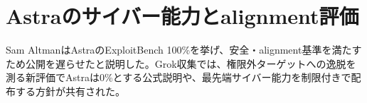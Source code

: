 \section{Astraのサイバー能力とalignment評価}

Sam AltmanはAstraのExploitBench 100\%を挙げ、安全・alignment基準を満たすため公開を遅らせたと説明した。Grok収集では、権限外ターゲットへの逸脱を測る新評価でAstraは0\%とする公式説明や、最先端サイバー能力を制限付きで配布する方針が共有された。


